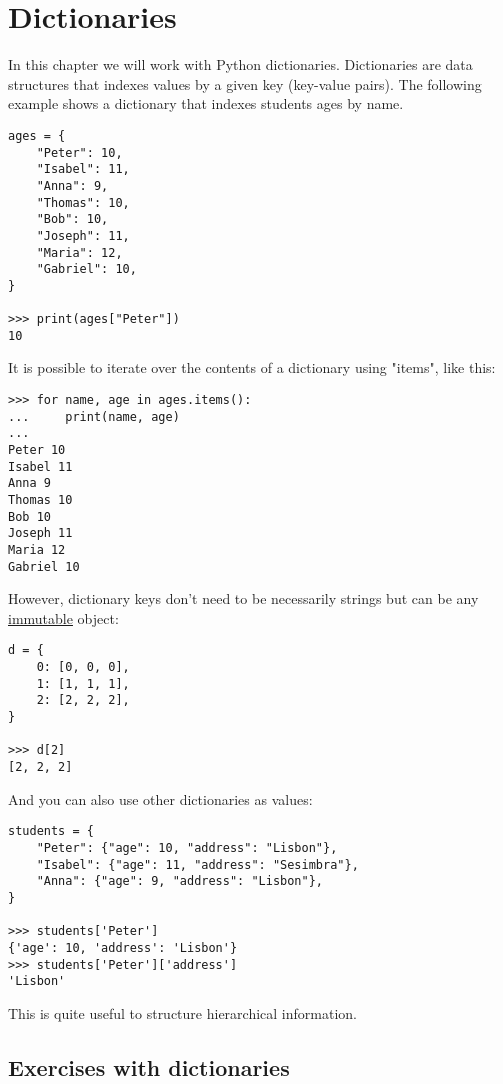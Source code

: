 \chapter{Dictionaries}\label{dictionaries}

In this chapter we will work with Python dictionaries. Dictionaries are data structures that indexes values by a given key (key-value pairs). The following example shows a dictionary that indexes students ages by name.

\begin{lstlisting}
ages = {
    "Peter": 10,
    "Isabel": 11,
    "Anna": 9,
    "Thomas": 10,
    "Bob": 10,
    "Joseph": 11,
    "Maria": 12,
    "Gabriel": 10,
}

>>> print(ages["Peter"])
10
\end{lstlisting}

It is possible to iterate over the contents of a dictionary using "items", like this:

\begin{lstlisting}
>>> for name, age in ages.items():
...     print(name, age)
...
Peter 10
Isabel 11
Anna 9
Thomas 10
Bob 10
Joseph 11
Maria 12
Gabriel 10
\end{lstlisting}

However, dictionary keys don't need to be necessarily strings but can be any \href{https://docs.python.org/3/tutorial/datastructures.html#dictionaries}{immutable} object:

\begin{lstlisting}
d = {
    0: [0, 0, 0],
    1: [1, 1, 1],
    2: [2, 2, 2],
}

>>> d[2]
[2, 2, 2]
\end{lstlisting}

And you can also use other dictionaries as values:

\begin{lstlisting}
students = {
    "Peter": {"age": 10, "address": "Lisbon"},
    "Isabel": {"age": 11, "address": "Sesimbra"},
    "Anna": {"age": 9, "address": "Lisbon"},
}

>>> students['Peter']
{'age': 10, 'address': 'Lisbon'}
>>> students['Peter']['address']
'Lisbon'
\end{lstlisting}

This is quite useful to structure hierarchical information.

\section{Exercises with dictionaries}

